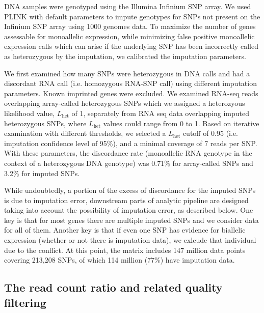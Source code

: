 \documentclass[letterpaper]{article}
\begin{document}
DNA samples were genotyped using the Illumina Infinium SNP array. We used
PLINK with default parameters to impute genotypes for SNPs not present on the
Infinium SNP array using 1000 genomes data. To maximize the number of genes
assessable for monoallelic expression, while minimizing false positive
monoallelic expression calls which can arise if the underlying SNP has been
incorrectly called as heterozygous by the imputation, we calibrated the
imputation parameters.

We first examined how many SNPs were heterozygous in DNA calls and had a
discordant RNA call (i.e. homozygous RNA-SNP call) using different imputation
parameters. Known imprinted genes were excluded. We examined RNA-seq reads
overlapping array-called heterozygous SNPs which we assigned a heterozyous
likelihood value, \(L_\mathrm{het}\) of 1, separately from RNA seq data
overlapping imputed heterozygous SNPs, where \(L_\mathrm{het}\) values could
range from 0 to 1. Based on iterative examination with different thresholds,
we selected a \(L_\mathrm{het}\) cutoff of 0.95 (i.e. imputation confidence
level of 95\%), and a minimal coverage of 7 reads per SNP. With these
parameters, the discordance rate (monoallelic RNA genotype in the context of a
heterozygous DNA genotype) was 0.71\% for array-called SNPs and 3.2\% for
imputed SNPs.

While undoubtedly, a portion of the excess of discordance for the imputed SNPs
is due to imputation error, downstream parts of analytic pipeline are designed
taking into account the possibility of imputation error, as described below.
One key is that for most genes there are multiple imputed SNPs and we consider
data for all of them. Another key is that if even one SNP has evidence for
biallelic expression (whether or not there is imputation data), we exlcude
that individual due to the conflict. At this point, the matrix includes 147
million data points covering 213,208 SNPs, of which 114 million (77\%) have
imputation data.

\subsection{The read count ratio and related quality filtering}

\label{sec:filtering}
\end{document}
